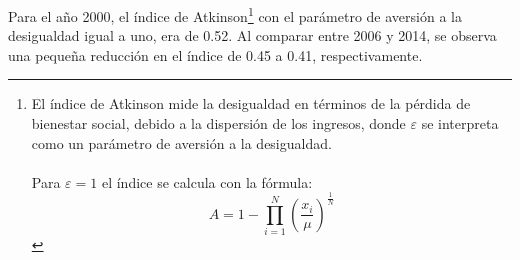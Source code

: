  Para el año 2000, el índice de Atkinson\footnote{El índice de Atkinson mide la desigualdad en términos de la pérdida de bienestar social, debido a la dispersión de los ingresos, donde $\varepsilon$ se interpreta como un parámetro de aversión a la desigualdad.\\\\ 
	Para $\varepsilon = \mbox{1} $ el índice se calcula con la fórmula: 
	\[ A =  1 - \prod_{i=1}^{N}\left(\frac{x_i}{\mu}
\right)^{\frac{1}{N}}   \]} con el parámetro de aversión a la desigualdad igual a uno, era de 0.52. Al comparar entre 2006 y 2014, se observa una pequeña reducción en el índice de 0.45 a 0.41, respectivamente.